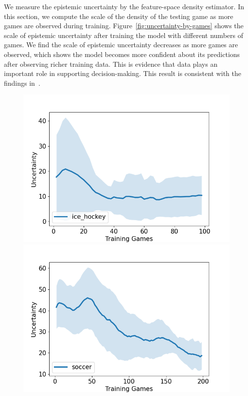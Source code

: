 \documentclass{article}
\begin{document}
We measure the epistemic uncertainty by the feature-space density estimator. In this section, we compute the scale of the density of the testing game as more games are observed during training. Figure~\ref{fig:uncertainty-by-games} shows the scale of epistemic uncertainty after training the model with different numbers of games. We find the scale of epistemic uncertainty decreases as more games are observed, which shows the model becomes more confident about its predictions after observing richer training data. This is evidence that data plays an important role in supporting decision-making. This result is consistent with the findings in~\cite{Mavrin2019DistributionalRL}.

\begin{figure}[htbp]
\begin{minipage}[t]{0.50\textwidth}
    \hspace{-0.25in}\includegraphics[scale=0.45]{figures/uncertainty_by_games_ice-hockey_maf_type-maf-split_blocks-5_inputs-45_hidden-180_cond-3_lr-0.0001_condValue_Aug-07-2022-23:50_shadow.png}
    \captionsetup{width=.95\linewidth}
\end{minipage}%
\begin{minipage}[t]{0.50\textwidth}
    \centering
    \includegraphics[scale=0.45]{figures/uncertainty_by_games_soccer_maf_type-maf-split_blocks-5_inputs-18_hidden-64_cond-46_lr-0.0001_condAct_condValue_Aug-08-2022-18:09_shadow.png}

\end{minipage}
\end{figure}
\end{document}
